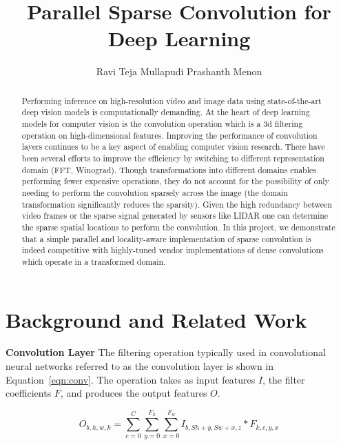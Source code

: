 \documentclass{article}
\title{Parallel Sparse Convolution for Deep Learning}
\author{
  Ravi Teja Mullapudi 
  \And
  Prashanth Menon
}
\begin{document}

\maketitle

\begin{abstract}
Performing inference on high-resolution video and image data using
state-of-the-art deep vision models is computationally demanding.  At the
heart of deep learning models for computer vision is the convolution
operation which is a 3d filtering operation on high-dimensional features.
Improving the performance of convolution layers continues to be a key aspect
of enabling computer vision research. There have been several efforts to
improve the efficiency by switching to different representation domain (FFT,
Winograd).  Though transformations into different domains enables performing
fewer expensive operations, they do not account for the possibility of only
needing to perform the convolution sparsely across the image (the domain
transformation significantly reduces the sparsity). Given the high
redundancy between video frames or the sparse signal generated by sensors
like LIDAR one can determine the sparse spatial locations to perform the
convolution. In this project, we demonstrate that a simple parallel and
locality-aware implementation of sparse convolution is indeed competitive
with highly-tuned vendor implementations of dense convolutions which operate
in a transformed domain.
\end{abstract}

\newcommand{\floor}[1]{\lfloor #1 \rfloor}
\newcommand{\ceil}[1]{\lceil #1 \rceil}

\section{Background and Related Work}
\label{sec:bg-rw}
\textbf{Convolution Layer} 
The filtering operation typically used in convolutional neural networks referred
to as the convolution layer is shown in Equation~\ref{eqn:conv}. The operation
takes as input features $I$, the filter coefficients $F$, and produces the
output features $O$.

\begin{equation}
O_{b, h, w, k} = \sum_{c=0}^{C}\sum_{y=0}^{F_h} \sum_{x=0}^{F_w} I_{b, S h+y, S
    w+x, z} * F_{k, c, y, x}
\label{eqn:conv}
\end{equation}
\end{document}
